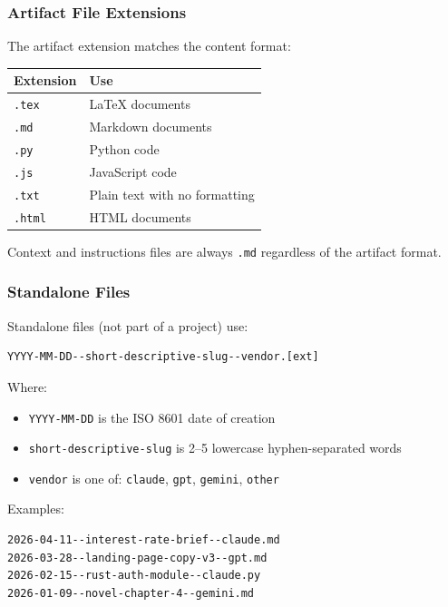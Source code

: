 \documentclass[12pt,letterpaper]{article}
\begin{document}
\subsubsection{Artifact File Extensions}

The artifact extension matches the content format:

\begin{center}
\begin{tabular}{@{}ll@{}}
\toprule
\textbf{Extension} & \textbf{Use} \\
\midrule
\texttt{.tex} & LaTeX documents \\
\texttt{.md} & Markdown documents \\
\texttt{.py} & Python code \\
\texttt{.js} & JavaScript code \\
\texttt{.txt} & Plain text with no formatting \\
\texttt{.html} & HTML documents \\
\bottomrule
\end{tabular}
\end{center}

Context and instructions files are always \texttt{.md} regardless of the
artifact format.

\subsubsection{Standalone Files}

Standalone files (not part of a project) use:

\begin{lstlisting}
YYYY-MM-DD--short-descriptive-slug--vendor.[ext]
\end{lstlisting}

Where:
\begin{itemize}
  \item \texttt{YYYY-MM-DD} is the ISO 8601 date of creation
  \item \texttt{short-descriptive-slug} is 2--5 lowercase hyphen-separated words
  \item \texttt{vendor} is one of: \texttt{claude}, \texttt{gpt},
        \texttt{gemini}, \texttt{other}
\end{itemize}

Examples:
\begin{lstlisting}
2026-04-11--interest-rate-brief--claude.md
2026-03-28--landing-page-copy-v3--gpt.md
2026-02-15--rust-auth-module--claude.py
2026-01-09--novel-chapter-4--gemini.md
\end{lstlisting}
\end{document}
